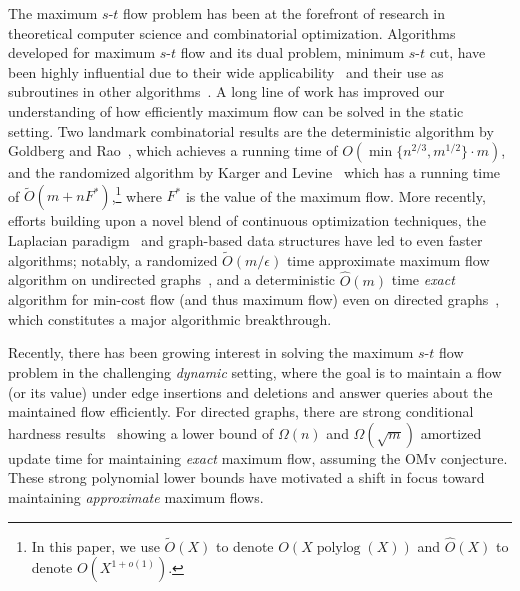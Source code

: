 \documentclass[11pt,a4paper]{article}
\newcommand{\polylog}{\operatorname{polylog}}
\newcommand{\tO}{\ensuremath{\widetilde O}}
\newcommand{\hO}{\ensuremath{\widehat O}}
\newcommand{\eps}{\epsilon}
\begin{document}
The maximum $s$-$t$ flow problem has been at the forefront of research in theoretical computer science and combinatorial optimization. Algorithms developed for maximum $s$-$t$ flow and its dual problem, minimum $s$-$t$ cut, have been highly influential due to their wide applicability~\cite{ahuja1995applications} and their use as subroutines in other algorithms~\cite{arora2012multiplicative, sherman2009breaking}.
A long line of work has improved our understanding of how efficiently maximum flow can be solved in the static setting. Two landmark combinatorial results are the deterministic algorithm by Goldberg and Rao~\cite{GR98flow}, which achieves a running time of $O(\min \{ n^{2/3}, m^{1/2}  \} \cdot m)$, and the randomized algorithm by Karger and Levine~\cite{KL15sampling} which has a running time of $\tO(m + nF^*)$,\footnote{In this paper, we use $\tO(X)$ to denote $O(X \polylog(X))$ and $\hO(X)$ to denote $O(X^{1+o(1)})$.} where $F^*$ is the value of the maximum flow.
More recently, efforts building upon a novel blend of continuous optimization techniques, the Laplacian paradigm~\cite{teng2010laplacian} and graph-based data structures have led to even faster algorithms; notably, a randomized $\tO(m/\eps)$ time approximate maximum flow algorithm on undirected graphs~\cite{She13almostflow, KLOS14almost, Pen16nearly, She17areaconvex}, and a deterministic $\hO(m)$ time \emph{exact} algorithm for min-cost flow (and thus maximum flow) even on directed graphs~\cite{CKL22almost, CKL24incremental}, which constitutes a major algorithmic breakthrough.

Recently, there has been growing interest in solving the maximum $s$-$t$ flow problem in the challenging \emph{dynamic} setting, where the goal is to maintain a flow (or its value) under edge insertions and deletions and answer queries about the maintained flow efficiently.
For directed graphs, there are strong conditional hardness results~\cite{Dah16lbs, HKNS15omv} showing a lower bound of $\Omega(n)$ and $\Omega(\sqrt{m})$ amortized update time for maintaining \emph{exact} maximum flow, assuming the OMv conjecture. These strong polynomial lower bounds have motivated a shift in focus toward maintaining \emph{approximate} maximum flows.
\end{document}
